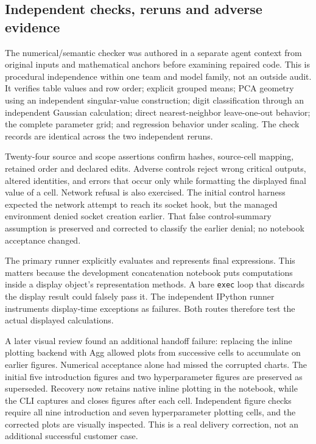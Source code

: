 \subsection{Independent checks, reruns and adverse evidence}
The numerical/semantic checker was authored in a separate agent context from original inputs and mathematical anchors before examining repaired code. This is procedural independence within one team and model family, not an outside audit. It verifies table values and row order; explicit grouped means; PCA geometry using an independent singular-value construction; digit classification through an independent Gaussian calculation; direct nearest-neighbor leave-one-out behavior; the complete parameter grid; and regression behavior under scaling. The check records are identical across the two independent reruns.

Twenty-four source and scope assertions confirm hashes, source-cell mapping, retained order and declared edits. Adverse controls reject wrong critical outputs, altered identities, and errors that occur only while formatting the displayed final value of a cell. Network refusal is also exercised. The initial control harness expected the network attempt to reach its socket hook, but the managed environment denied socket creation earlier. That false control-summary assumption is preserved and corrected to classify the earlier denial; no notebook acceptance changed.

The primary runner explicitly evaluates and represents final expressions. This matters because the development concatenation notebook puts computations inside a display object's representation methods. A bare \texttt{exec} loop that discards the display result could falsely pass it. The independent IPython runner instruments display-time exceptions as failures. Both routes therefore test the actual displayed calculations.

A later visual review found an additional handoff failure: replacing the inline plotting backend with Agg allowed plots from successive cells to accumulate on earlier figures. Numerical acceptance alone had missed the corrupted charts. The initial five introduction figures and two hyperparameter figures are preserved as superseded. Recovery now retains native inline plotting in the notebook, while the CLI captures and closes figures after each cell. Independent figure checks require all nine introduction and seven hyperparameter plotting cells, and the corrected plots are visually inspected. This is a real delivery correction, not an additional successful customer case.

